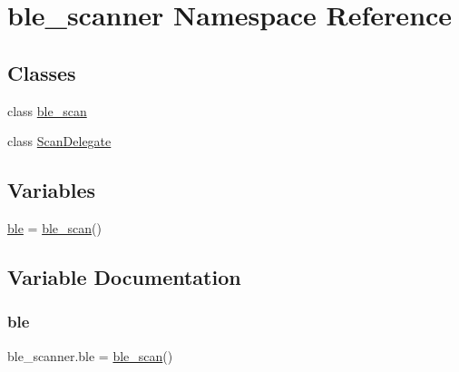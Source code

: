 \hypertarget{namespaceble__scanner}{}\section{ble\+\_\+scanner Namespace Reference}
\label{namespaceble__scanner}
\subsection*{Classes}
\begin{DoxyCompactItemize}
\item 
class \hyperlink{classble__scanner_1_1ble__scan}{ble\+\_\+scan}
\item 
class \hyperlink{classble__scanner_1_1ScanDelegate}{Scan\+Delegate}
\end{DoxyCompactItemize}
\subsection*{Variables}
\begin{DoxyCompactItemize}
\item 
\hyperlink{namespaceble__scanner_a7a11ffc3e3fa4e63a3699a3c0a35fea0}{ble} = \hyperlink{classble__scanner_1_1ble__scan}{ble\+\_\+scan}()
\end{DoxyCompactItemize}


\subsection{Variable Documentation}
\mbox{\label{namespaceble__scanner_a7a11ffc3e3fa4e63a3699a3c0a35fea0}} 
\subsubsection{\texorpdfstring{ble}{ble}}
{\footnotesize\ttfamily ble\+\_\+scanner.\+ble = \hyperlink{classble__scanner_1_1ble__scan}{ble\+\_\+scan}()}

